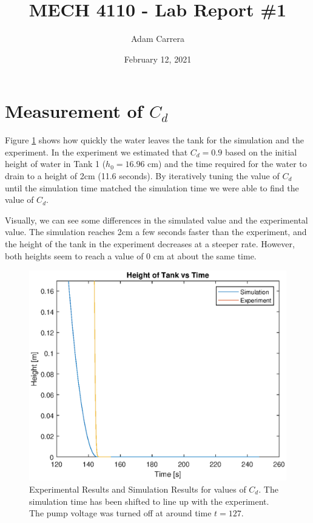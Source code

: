 \documentclass[12pt]{article}
\author{Adam Carrera}
\date{February 12, 2021}
\title{MECH 4110 - Lab Report \#1}
\numberwithin{equation}{section}
\begin{document}
  \maketitle

  \newpage

  \section{Measurement of $ C_d $}

  Figure \ref{fig:fig1} shows how quickly the water leaves the tank for the simulation and the experiment. In the experiment we estimated that $ C_d = 0.9 $ based on the initial height of water in Tank 1 ($ h_0 = 16.96 \text{ cm} $) and the time required for the water to drain to a height of 2cm (11.6 seconds). By iteratively tuning the value of $ C_d $ until the simulation time matched the simulation time we were able to find the value of $ C_d. $

  Visually, we can see some differences in the simulated value and the experimental value. The simulation reaches 2cm a few seconds faster than the experiment, and the height of the tank in the experiment decreases at a steeper rate. However, both heights seem to reach a value of 0 cm at about the same time.

  \begin{figure}[ht!]
    \centering
    \includegraphics[width = \textwidth]{figures/figure1}
    \caption{Experimental Results and Simulation Results for values of $ C_d. $ The simulation time has been shifted to line up with the experiment. The pump voltage was turned off at around time $ t = 127. $}
    \label{fig:fig1}
  \end{figure}
\end{document}
